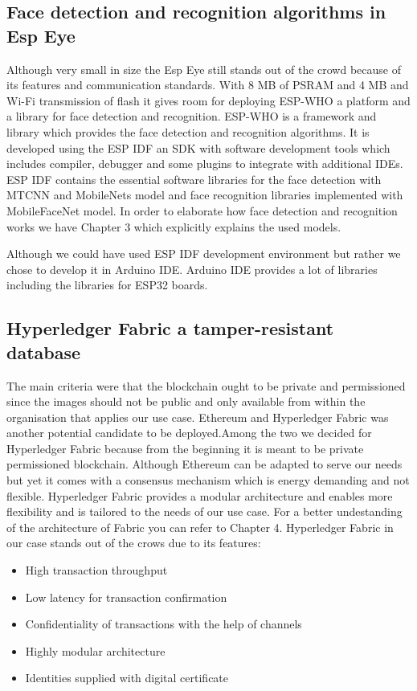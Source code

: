 \subsection{Face detection and recognition algorithms in Esp Eye}
Although very small in size the Esp Eye still stands out of the crowd because of its features and communication standards. With 8 MB of PSRAM and 4 MB and Wi-Fi transmission of flash it gives room for deploying ESP-WHO a platform and a library for face detection and recognition. ESP-WHO is a framework and library which provides the face detection and recognition algorithms. It is developed using the ESP IDF an SDK with software development tools which includes compiler, debugger and some plugins to integrate with additional IDEs.  ESP IDF contains the essential software libraries for the face detection with MTCNN and MobileNets model and face recognition libraries implemented with MobileFaceNet model. In order to elaborate how face detection and recognition works we have Chapter 3 which explicitly explains the used models. 

Although we could have used ESP IDF development environment but rather we chose to develop it in Arduino IDE. Arduino IDE provides a lot of libraries including the libraries for ESP32 boards. 



\subsection{Hyperledger Fabric a tamper-resistant database}

  The main criteria were that the blockchain ought to be private and permissioned since the images should not be public and only available from within the organisation that applies our use case. Ethereum and Hyperledger Fabric was another potential candidate to be deployed.Among the two we decided for Hyperledger Fabric because from the beginning it is meant to be private permissioned blockchain. Although Ethereum can be adapted to serve our needs but yet it comes with a consensus mechanism which is energy demanding and not flexible. Hyperledger Fabric provides a modular architecture and enables more flexibility and is tailored to the needs of our use case. For a better undestanding of the architecture of Fabric you can refer to Chapter 4.  Hyperledger Fabric in our case stands out of the crows due to its features: 

\begin{itemize}
    \item High transaction throughput
    \item Low latency for transaction confirmation
    \item Confidentiality of transactions with the help of channels
    \item Highly modular architecture
    \item Identities supplied with digital certificate 
\end{itemize}

